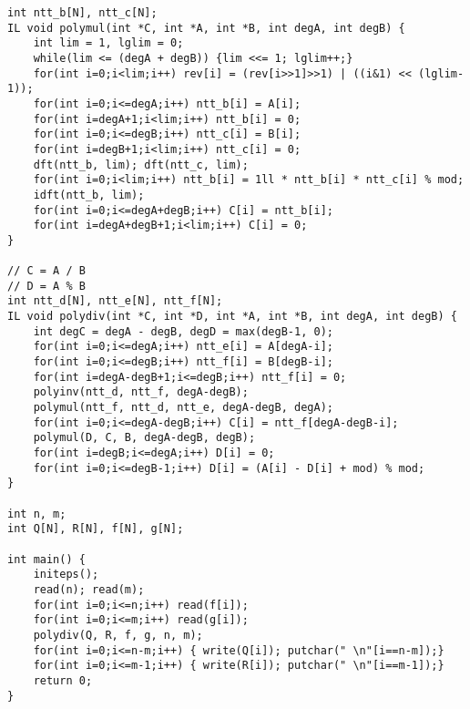 \documentclass[UTF8]{ctexart}
\begin{document}
\begin{framed}
\begin{lstlisting}
int ntt_b[N], ntt_c[N];
IL void polymul(int *C, int *A, int *B, int degA, int degB) {
    int lim = 1, lglim = 0;
    while(lim <= (degA + degB)) {lim <<= 1; lglim++;}
    for(int i=0;i<lim;i++) rev[i] = (rev[i>>1]>>1) | ((i&1) << (lglim-1));
    for(int i=0;i<=degA;i++) ntt_b[i] = A[i];
    for(int i=degA+1;i<lim;i++) ntt_b[i] = 0;
    for(int i=0;i<=degB;i++) ntt_c[i] = B[i];
    for(int i=degB+1;i<lim;i++) ntt_c[i] = 0;
    dft(ntt_b, lim); dft(ntt_c, lim);
    for(int i=0;i<lim;i++) ntt_b[i] = 1ll * ntt_b[i] * ntt_c[i] % mod;
    idft(ntt_b, lim);
    for(int i=0;i<=degA+degB;i++) C[i] = ntt_b[i];
    for(int i=degA+degB+1;i<lim;i++) C[i] = 0;
}

// C = A / B
// D = A % B
int ntt_d[N], ntt_e[N], ntt_f[N];
IL void polydiv(int *C, int *D, int *A, int *B, int degA, int degB) {
    int degC = degA - degB, degD = max(degB-1, 0);
    for(int i=0;i<=degA;i++) ntt_e[i] = A[degA-i];
    for(int i=0;i<=degB;i++) ntt_f[i] = B[degB-i];
    for(int i=degA-degB+1;i<=degB;i++) ntt_f[i] = 0;
    polyinv(ntt_d, ntt_f, degA-degB);
    polymul(ntt_f, ntt_d, ntt_e, degA-degB, degA);
    for(int i=0;i<=degA-degB;i++) C[i] = ntt_f[degA-degB-i];
    polymul(D, C, B, degA-degB, degB);
    for(int i=degB;i<=degA;i++) D[i] = 0;
    for(int i=0;i<=degB-1;i++) D[i] = (A[i] - D[i] + mod) % mod;
}

int n, m;
int Q[N], R[N], f[N], g[N];

int main() {
    initeps();
    read(n); read(m);
    for(int i=0;i<=n;i++) read(f[i]);
    for(int i=0;i<=m;i++) read(g[i]);
    polydiv(Q, R, f, g, n, m);
    for(int i=0;i<=n-m;i++) { write(Q[i]); putchar(" \n"[i==n-m]);}
    for(int i=0;i<=m-1;i++) { write(R[i]); putchar(" \n"[i==m-1]);}
    return 0;
}
\end{lstlisting}
\end{framed}
\end{document}
